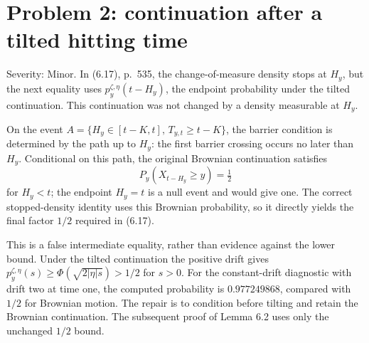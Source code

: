 \documentclass[10pt]{article}
\begin{document}
\section*{Problem 2: continuation after a tilted hitting time}
Severity: Minor. In (6.17), p. 535, the change-of-measure density stops at \(H_y\), but the next equality uses \(p_y^{\zeta,\eta}(t-H_y)\), the endpoint probability under the tilted continuation. This continuation was not changed by a density measurable at \(H_y\).\par
On the event \(A=\{H_y\in[t-K,t],\,T_{y,t}\ge t-K\}\), the barrier condition is determined by the path up to \(H_y\): the first barrier crossing occurs no later than \(H_y\). Conditional on this path, the original Brownian continuation satisfies \[P_y(X_{t-H_y}\ge y)=\tfrac12\] for \(H_y<t\); the endpoint \(H_y=t\) is a null event and would give one. The correct stopped-density identity uses this Brownian probability, so it directly yields the final factor \(1/2\) required in (6.17).\par
This is a false intermediate equality, rather than evidence against the lower bound. Under the tilted continuation the positive drift gives \(p_y^{\zeta,\eta}(s)\ge\Phi(\sqrt{2|\eta|s})>1/2\) for \(s>0\). For the constant-drift diagnostic with drift two at time one, the computed probability is \(0.977249868\), compared with \(1/2\) for Brownian motion. The repair is to condition before tilting and retain the Brownian continuation. The subsequent proof of Lemma 6.2 uses only the unchanged \(1/2\) bound.\par
\end{document}

